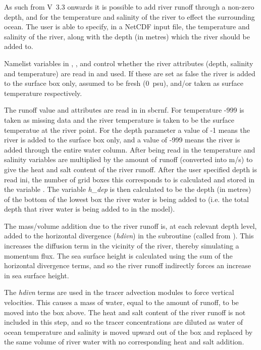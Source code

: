 \documentclass[../tex_main/NEMO_manual]{subfiles}
\begin{document}
As such from V~3.3 onwards it is possible to add river runoff through a non-zero depth,
and for the temperature and salinity of the river to effect the surrounding ocean.
The user is able to specify, in a NetCDF input file, the temperature and salinity of the river,
along with the depth (in metres) which the river should be added to.

Namelist variables in , ,  and
 control whether the river attributes (depth, salinity and temperature) are read in and used.
If these are set as false the river is added to the surface box only, assumed to be fresh (0~psu),
and/or taken as surface temperature respectively.

The runoff value and attributes are read in in sbcrnf.  
For temperature -999 is taken as missing data and the river temperature is taken to
be the surface temperatue at the river point.
For the depth parameter a value of -1 means the river is added to the surface box only, 
and a value of -999 means the river is added through the entire water column. 
After being read in the temperature and salinity variables are multiplied by the amount of runoff
(converted into m/s) to give the heat and salt content of the river runoff.
After the user specified depth is read ini,
the number of grid boxes this corresponds to is calculated and stored in the variable .
The variable \textit{h\_dep} is then calculated to be the depth (in metres) of
the bottom of the lowest box the river water is being added to
(i.e. the total depth that river water is being added to in the model).

The mass/volume addition due to the river runoff is, at each relevant depth level, added to
the horizontal divergence (\textit{hdivn}) in the subroutine  (called from ).
This increases the diffusion term in the vicinity of the river, thereby simulating a momentum flux.
The sea surface height is calculated using the sum of the horizontal divergence terms,
and so the river runoff indirectly forces an increase in sea surface height. 

The \textit{hdivn} terms are used in the tracer advection modules to force vertical velocities.
This causes a mass of water, equal to the amount of runoff, to be moved into the box above.
The heat and salt content of the river runoff is not included in this step,
and so the tracer concentrations are diluted as water of ocean temperature and salinity is moved upward out of
the box and replaced by the same volume of river water with no corresponding heat and salt addition.
\end{document}
